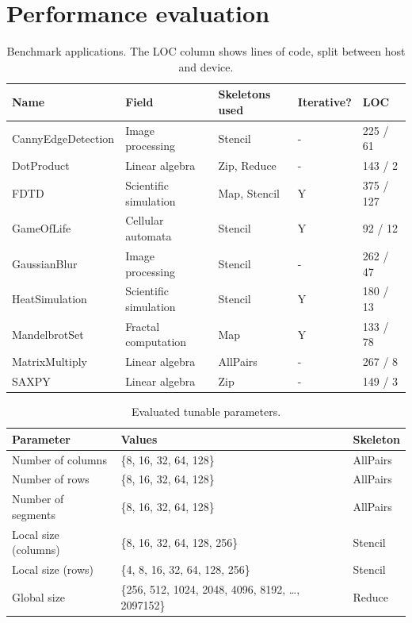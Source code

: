 \newpage
\section*{Performance evaluation}

\begin{table}
\footnotesize
\centering
\begin{tabular}{| l | l | l | l | l |}
\hline
\textbf{Name} & \textbf{Field} & \textbf{Skeletons used} & \textbf{Iterative?} & \textbf{LOC}\\
\hline
CannyEdgeDetection & Image processing & Stencil & - & 225 / 61\\
DotProduct & Linear algebra & Zip, Reduce & - & 143 / 2\\
FDTD & Scientific simulation & Map, Stencil & Y & 375 / 127\\
GameOfLife & Cellular automata & Stencil & Y & 92 / 12\\
GaussianBlur & Image processing & Stencil & - & 262 / 47\\
HeatSimulation & Scientific simulation & Stencil & Y & 180 / 13\\
MandelbrotSet & Fractal computation & Map & Y & 133 / 78\\
MatrixMultiply & Linear algebra & AllPairs & - & 267 / 8\\
SAXPY & Linear algebra & Zip & - & 149 / 3\\
\hline
\end{tabular}
\caption{Benchmark applications. The LOC column shows lines of code, split between host and device.}
\end{table}


\begin{table}
\footnotesize
\centering
\begin{tabular}{| l | l | l |}
\hline
\textbf{Parameter} & \textbf{Values} & \textbf{Skeleton}\\
\hline
Number of columns & \{8, 16, 32, 64, 128\} & AllPairs\\
Number of rows & \{8, 16, 32, 64, 128\} & AllPairs\\
Number of segments & \{8, 16, 32, 64, 128\} & AllPairs\\
Local size (columns) & \{8, 16, 32, 64, 128, 256\} & Stencil\\
Local size (rows) & \{4, 8, 16, 32, 64, 128, 256\} & Stencil\\
Global size & \{256, 512, 1024, 2048, 4096, 8192, \ldots, 2097152\} & Reduce\\
\hline
\end{tabular}
\caption{Evaluated tunable parameters.}
\end{table}


